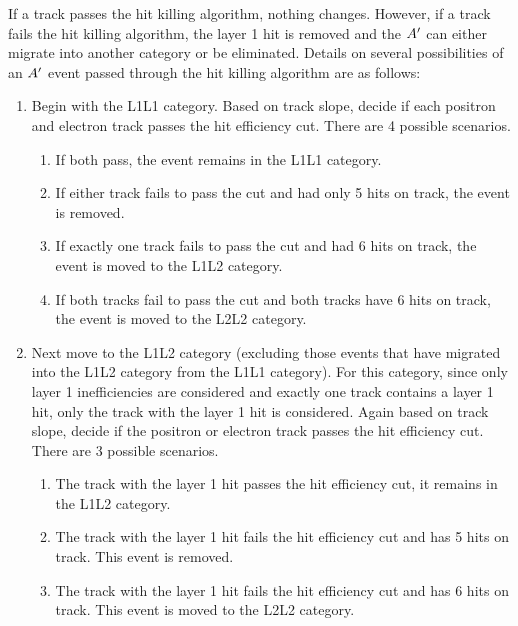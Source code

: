 
If a track passes the hit killing algorithm, nothing changes. However, if a track fails the hit killing algorithm, the layer 1 hit is removed and the $A^\prime$ can either migrate into another category or be eliminated. Details on several possibilities of an $A^\prime$ event passed through the hit killing algorithm are as follows:

\begin{enumerate}
  \item Begin with the L1L1 category. Based on track slope, decide if each positron and electron track passes the hit efficiency cut. There are 4 possible scenarios.
  \begin{enumerate}
    \item If both pass, the event remains in the L1L1 category. 
    \item If either track fails to pass the cut and had only 5 hits on track, the event is removed. 
    \item If exactly one track fails to pass the cut and had 6 hits on track, the event is moved to the L1L2 category. 
    \item If both tracks fail to pass the cut and both tracks have 6 hits on track, the event is moved to the L2L2 category.
  \end{enumerate}
  \item Next move to the L1L2 category (excluding those events that have migrated into the L1L2 category from the L1L1 category). For this category, since only layer 1 inefficiencies are considered and exactly one track contains a layer 1 hit, only the track with the layer 1 hit is considered. Again based on track slope, decide if the positron or electron track passes the hit efficiency cut. There are 3 possible scenarios.
  \begin{enumerate}
    \item The track with the layer 1 hit passes the hit efficiency cut, it remains in the L1L2 category.
    \item The track with the layer 1 hit fails the hit efficiency cut and has 5 hits on track. This event is removed.
    \item The track with the layer 1 hit fails the hit efficiency cut and has 6 hits on track. This event is moved to the L2L2 category.

\end{enumerate}
\end{enumerate}
